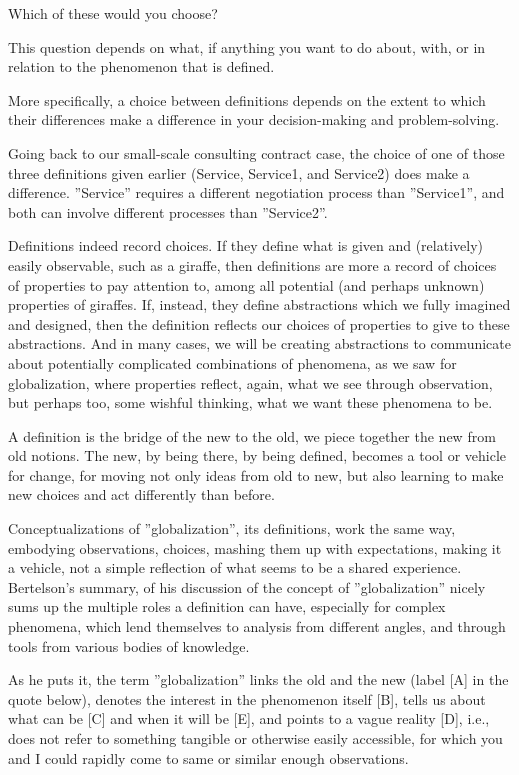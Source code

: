 \documentclass[graybox,envcountchap,sectrefs]{svmono}
\begin{document}
Which of these would you choose?

This question depends on what, if anything you want to do about, with, or in relation to the phenomenon that is defined.

More specifically, a choice between definitions depends on the extent to which their differences make a difference in your decision-making and problem-solving.

Going back to our small-scale consulting contract case, the choice of one of those three definitions given earlier (Service, Service1, and Service2) does make a difference. ''Service'' requires a different negotiation process than ''Service1'', and both can involve different processes than ''Service2''.

Definitions indeed record choices. If they define what is given and (relatively) easily observable, such as a giraffe, then definitions are more a record of choices of properties to pay attention to, among all potential (and perhaps unknown) properties of giraffes. If, instead, they define abstractions which we fully imagined and designed, then the definition reflects our choices of properties to give to these abstractions. And in many cases, we will be creating abstractions to communicate about potentially complicated combinations of phenomena, as we saw for globalization, where properties reflect, again, what we see through observation, but perhaps too, some wishful thinking, what we want these phenomena to be.

A definition is the bridge of the new to the old, we piece together the new from old notions. The new, by being there, by being defined, becomes a tool or vehicle for change, for moving not only ideas from old to new, but also learning to make new choices and act differently than before. 

Conceptualizations of ''globalization'', its definitions, work the same way, embodying observations, choices, mashing them up with expectations, making it a vehicle, not a simple reflection of what seems to be a shared experience. Bertelson's summary, of his discussion of the concept of ''globalization'' nicely sums up the multiple roles a definition can have, especially for complex phenomena, which lend themselves to analysis from different angles, and through tools from various bodies of knowledge.

As he puts it, the term ''globalization'' links the old and the new (label [A] in the quote below), denotes the interest in the phenomenon itself [B], tells us about what can be [C] and when it will be [E], and points to a vague reality [D], i.e., does not refer to something tangible or otherwise easily accessible, for which you and I could rapidly come to same or similar enough observations.
\end{document}
